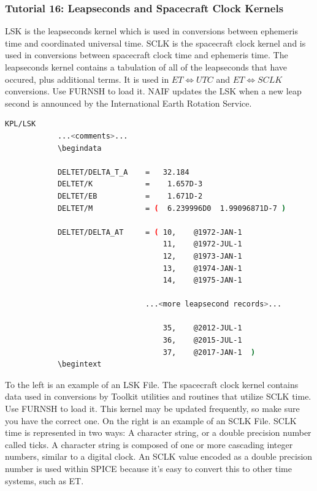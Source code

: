 \documentclass[crop=false,class=book]{standalone}
\begin{document}
            \subsubsection{Tutorial 16: Leapseconds and Spacecraft Clock Kernels}
            LSK is the leapseconds kernel which is used in conversions between ephemeris time and coordinated universal time. SCLK is the spacecraft clock kernel and is used in conversions between spacecraft clock time and ephemeris time. The leapseconds kernel contains a tabulation of all of the leapseconds that have occured, plus additional terms. It is used in $ET\Leftrightarrow UTC$ and $ET\Leftrightarrow SCLK$ conversions. Use FURNSH to load it. NAIF updates the LSK when a new leap second is announced by the International Earth Rotation Service.
            \begin{lstlisting}[language=bash,basicstyle=\footnotesize]
            KPL/LSK
            ...<comments>...
            \begindata
            
            DELTET/DELTA_T_A    =   32.184
            DELTET/K            =    1.657D-3
            DELTET/EB           =    1.671D-2
            DELTET/M            = (  6.239996D0  1.99096871D-7 )
            
            DELTET/DELTA_AT     = ( 10,    @1972-JAN-1
                                    11,    @1972-JUL-1
                                    12,    @1973-JAN-1
                                    13,    @1974-JAN-1
                                    14,    @1975-JAN-1
            
                                ...<more leapsecond records>...
            
                                    35,    @2012-JUL-1
                                    36,    @2015-JUL-1
                                    37,    @2017-JAN-1  )
            \begintext
            \end{lstlisting}
            To the left is an example of an LSK File. The spacecraft clock kernel contains data used in conversions by Toolkit utilities and routines that utilize SCLK time. Use FURNSH to load it. This kernel may be updated frequently, so make sure you have the correct one. On the right is an example of an SCLK File. SCLK time is represented in two ways: A character string, or a double precision number called ticks. A character string is composed of one or more cascading integer numbers, similar to a digital clock. An SCLK value encoded as a double precision number is used within SPICE because it's easy to convert this to other time systems, such as ET.
\end{document}
